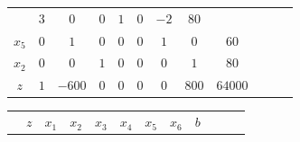 \begin{frame}
{\begin{table}
\begin{tabular}{c c c c c c c c c c c c}
				& \cellcolor{yellow!60}  $ \scriptstyle 3$ 
				& \cellcolor{yellow!60}  $ \scriptstyle 0$
				& \cellcolor{yellow!60}  $ \scriptstyle 0$
				& \cellcolor{yellow!60}  $ \scriptstyle 1$
				& \cellcolor{yellow!60}  $ \scriptstyle 0$
				& \cellcolor{yellow!60}  $ \scriptstyle -2$ 
				& \cellcolor{yellow!60}  $ \scriptstyle 80$ \\ 
				\cellcolor{blue!80} \color{red} $ \scriptstyle x_5$  
				& \cellcolor{yellow!60}  $ \scriptstyle 0$
				& \cellcolor{yellow!60}  $ \scriptstyle 1$ 
				& \cellcolor{yellow!60}  $ \scriptstyle 0$
				& \cellcolor{yellow!60}  $ \scriptstyle 0$
				& \cellcolor{yellow!60}  $ \scriptstyle 0$
				& \cellcolor{yellow!60}  $ \scriptstyle 1$
				& \cellcolor{yellow!60}  $ \scriptstyle 0$ 
				& \cellcolor{yellow!60}  $ \scriptstyle 60$ \\
				\cellcolor{blue!80} \color{red} $ \scriptstyle x_2$
				& \cellcolor{yellow!60}  $ \scriptstyle 0$
				& \cellcolor{yellow!60}  $ \scriptstyle 0$ 
				& \cellcolor{yellow!60}  $ \scriptstyle 1$
				& \cellcolor{yellow!60}  $ \scriptstyle 0$
				& \cellcolor{yellow!60}  $ \scriptstyle 0$
				& \cellcolor{yellow!60}  $ \scriptstyle 0$
				& \cellcolor{yellow!60}  $ \scriptstyle 1$ 
				& \cellcolor{yellow!60}  $ \scriptstyle 80$ \\
				\cellcolor{blue!80} \color{white} $ \scriptstyle z$
				& \cellcolor{yellow!60}  $ \scriptstyle 1$
				& \cellcolor{yellow!60}  $ \scriptstyle -600$ 
				& \cellcolor{yellow!60}  $ \scriptstyle 0$
				& \cellcolor{yellow!60}  $ \scriptstyle 0$
				& \cellcolor{yellow!60}  $ \scriptstyle 0$
				& \cellcolor{yellow!60}  $ \scriptstyle 0$
				& \cellcolor{yellow!60}  $ \scriptstyle 800$ 
				& \cellcolor{yellow!60}  $ \scriptstyle 64000$ \\
			\end{tabular}
		\end{table}	
	}	
	{
		\begin{table}
			\begin{tabular}{c c c c c c c c c c c c}
				& \cellcolor{blue!80} \color{white} $ \scriptstyle z$
				& \cellcolor{blue!80} \color{white} $ \scriptstyle x_1$ 
				& \cellcolor{blue!80} \color{red} $ \scriptstyle x_2$
				& \cellcolor{blue!80} \color{red} $ \scriptstyle x_3$
				& \cellcolor{blue!80} \color{red} $ \scriptstyle x_4$
				& \cellcolor{blue!80} \color{red} $ \scriptstyle x_5$
				& \cellcolor{blue!80} \color{white} $ \scriptstyle x_6$ 
				& \cellcolor{blue!80} \color{white} $ \scriptstyle b$ \\

\end{tabular}
\end{table}}
\end{frame}
